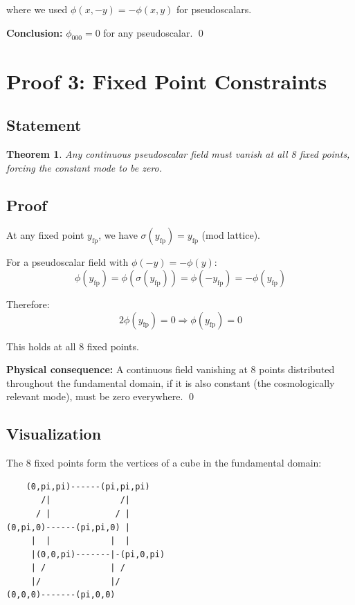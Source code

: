 \documentclass[12pt,a4paper]{article}
\newtheorem{theorem}{Theorem}
\begin{document}
where we used $\phi(x, -y) = -\phi(x, y)$ for pseudoscalars.

\textbf{Conclusion:} $\phi_{000} = 0$ for any pseudoscalar. \qed

\section{Proof 3: Fixed Point Constraints}

\subsection{Statement}

\begin{theorem}
Any continuous pseudoscalar field must vanish at all 8 fixed points, forcing the constant mode to be zero.
\end{theorem}

\subsection{Proof}

At any fixed point $y_{\text{fp}}$, we have $\sigma(y_{\text{fp}}) = y_{\text{fp}}$ (mod lattice).

For a pseudoscalar field with $\phi(-y) = -\phi(y)$:
\begin{equation}
\phi(y_{\text{fp}}) = \phi(\sigma(y_{\text{fp}})) = \phi(-y_{\text{fp}}) = -\phi(y_{\text{fp}})
\end{equation}

Therefore:
\begin{equation}
2\phi(y_{\text{fp}}) = 0 \Rightarrow \phi(y_{\text{fp}}) = 0
\end{equation}

This holds at all 8 fixed points.

\textbf{Physical consequence:} A continuous field vanishing at 8 points distributed throughout the fundamental domain, if it is also constant (the cosmologically relevant mode), must be zero everywhere. \qed

\subsection{Visualization}

The 8 fixed points form the vertices of a cube in the fundamental domain:
\begin{verbatim}
    (0,pi,pi)------(pi,pi,pi)
       /|              /|
      / |             / |
(0,pi,0)------(pi,pi,0) |
     |  |            |  |
     |(0,0,pi)-------|-(pi,0,pi)
     | /             | /
     |/              |/
(0,0,0)-------(pi,0,0)
\end{verbatim}
\end{document}
